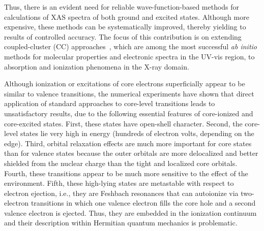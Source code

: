 \documentclass[journal=jctcce,manuscript=article]{achemso}
\begin{document}
Thus, there is an evident need for reliable wave-function-based methods for calculations of XAS spectra of both ground and excited states. Although more expensive, these methods can be systematically improved, thereby yielding to
results of controlled accuracy\cite{OlsenText}. The focus of this contribution is on extending coupled-cluster (CC)
approaches~\cite{koch1990,Stanton:93:EOMCC,Christiansen_IJQC,krylov_eom_2008,WF_Properties_Review,CC_EOMCC_Bartlett,Christiansen2006,Christiansen:EOMRev:11}, which are among the most successful \textit{ab initio} methods for molecular properties 
and electronic spectra in the UV-vis region, 
to  absorption and ionization phenomena in the X-ray domain\cite{coriani2012jctc,Peng2015,coriani2012pra,coriani2015jcp,naturecomm}.


Although ionization or excitations of core electrons superficially appear to be similar to valence transitions, the numerical experiments have shown that direct application of
standard approaches to core-level transitions leads to unsatisfactory results\cite{Norman:ChemRev:18}, due to the following essential features of core-ionized and core-excited states. 
First, these states have open-shell character\cite{Krylov:OSRev}.
Second, the core-level states lie very high in energy (hundreds of electron volts, depending on the edge).
Third, orbital relaxation effects are much more important
for core states than for valence states because the outer orbitals are more delocalized and better shielded from the nuclear charge than the tight and localized core orbitals.
Fourth, these transitions appear to be much more sensitive to the effect of the
environment\cite{Sadybekov:CoreIE:17,Kongsted:DECore:18}.
Fifth, these high-lying states are metastable with respect to electron 
ejection\cite{Reinhardt:CS:1982,KrylovResReview}, i.e., they are Feshbach resonances that can autoionize via two-electron transitions
in which one valence electron fills the core hole and a second valence electron is ejected.
Thus, they are embedded in the ionization continuum and their description within Hermitian quantum
mechanics is problematic. 
\end{document}
